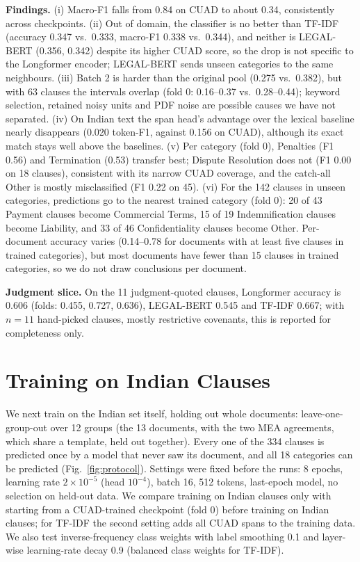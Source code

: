 \documentclass[conference]{IEEEtran}
\begin{document}
\textbf{Findings.} (i) Macro-F1 falls from 0.84 on CUAD to about 0.34, consistently across checkpoints. (ii) Out of domain, the classifier is no better than TF-IDF (accuracy 0.347 vs.\ 0.333, macro-F1 0.338 vs.\ 0.344), and neither is LEGAL-BERT (0.356, 0.342) despite its higher CUAD score, so the drop is not specific to the Longformer encoder; LEGAL-BERT sends unseen categories to the same neighbours. (iii) Batch 2 is harder than the original pool (0.275 vs.\ 0.382), but with 63 clauses the intervals overlap (fold 0: 0.16--0.37 vs.\ 0.28--0.44); keyword selection, retained noisy units and PDF noise are possible causes we have not separated. (iv) On Indian text the span head's advantage over the lexical baseline nearly disappears (0.020 token-F1, against 0.156 on CUAD), although its exact match stays well above the baselines. (v) Per category (fold 0), Penalties (F1 0.56) and Termination (0.53) transfer best; Dispute Resolution does not (F1 0.00 on 18 clauses), consistent with its narrow CUAD coverage, and the catch-all Other is mostly misclassified (F1 0.22 on 45). (vi) For the 142 clauses in unseen categories, predictions go to the nearest trained category (fold 0): 20 of 43 Payment clauses become Commercial Terms, 15 of 19 Indemnification clauses become Liability, and 33 of 46 Confidentiality clauses become Other. Per-document accuracy varies (0.14--0.78 for documents with at least five clauses in trained categories), but most documents have fewer than 15 clauses in trained categories, so we do not draw conclusions per document.

\textbf{Judgment slice.} On the 11 judgment-quoted clauses, Longformer accuracy is 0.606 (folds: 0.455, 0.727, 0.636), LEGAL-BERT 0.545 and TF-IDF 0.667; with $n=11$ hand-picked clauses, mostly restrictive covenants, this is reported for completeness only.

\section{Training on Indian Clauses}\label{sec:adapt}
We next train on the Indian set itself, holding out whole documents: leave-one-group-out over 12 groups (the 13 documents, with the two MEA agreements, which share a template, held out together). Every one of the 334 clauses is predicted once by a model that never saw its document, and all 18 categories can be predicted (Fig.~\ref{fig:protocol}). Settings were fixed before the runs: 8 epochs, learning rate $2\times10^{-5}$ (head $10^{-4}$), batch 16, 512 tokens, last-epoch model, no selection on held-out data. We compare training on Indian clauses only with starting from a CUAD-trained checkpoint (fold 0) before training on Indian clauses; for TF-IDF the second setting adds all CUAD spans to the training data. We also test inverse-frequency class weights with label smoothing 0.1 and layer-wise learning-rate decay 0.9 (balanced class weights for TF-IDF).
\end{document}

